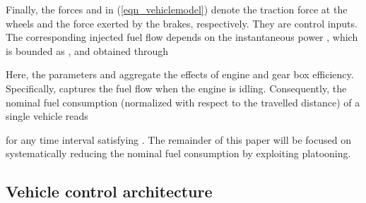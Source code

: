 \documentclass[journal]{IEEEtran}
\begin{document}
Finally, the forces  and  in (\ref{eqn_vehiclemodel}) denote the traction force at the wheels and the force exerted by the brakes, respectively. They are control inputs. The corresponding injected fuel flow  depends on the instantaneous power , which is bounded as , and obtained through

Here, the parameters  and  aggregate the effects of engine and gear box efficiency. Specifically,  captures the fuel flow when the engine is idling. Consequently, the nominal fuel consumption (normalized with respect to the travelled distance) of a single vehicle reads

for any time interval satisfying . The remainder of this paper will be focused on systematically reducing the nominal fuel consumption by exploiting platooning.


\subsection{Vehicle control architecture}\label{sec_vehiclecontrolarchitecture}
\end{document}
